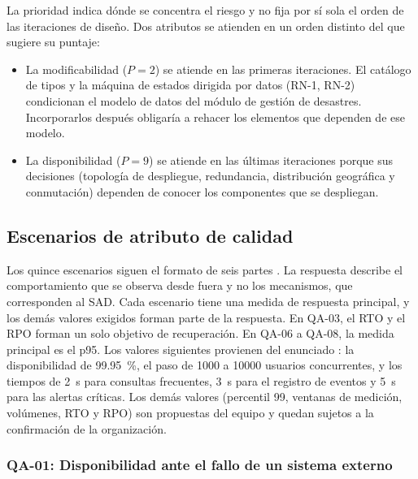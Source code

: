 \documentclass[11pt,letterpaper]{article}
\begin{document}
La prioridad indica dónde se concentra el riesgo y no fija por sí sola el orden de las iteraciones
de diseño. Dos atributos se atienden en un orden distinto del que sugiere su puntaje:

\begin{itemize}
  \item La modificabilidad ($P = 2$) se atiende en las primeras iteraciones. El catálogo de tipos y
        la máquina de estados dirigida por datos (RN-1, RN-2) condicionan el modelo de datos del
        módulo de gestión de desastres. Incorporarlos después obligaría a rehacer los elementos que
        dependen de ese modelo.
  \item La disponibilidad ($P = 9$) se atiende en las últimas iteraciones porque sus decisiones
        (topología de despliegue, redundancia, distribución geográfica y conmutación) dependen de
        conocer los componentes que se despliegan.
\end{itemize}

\subsection{Escenarios de atributo de calidad}
\label{sec:escenarios}

Los quince escenarios siguen el formato de seis partes \cite{bass}. La respuesta describe el
comportamiento que se observa desde fuera y no los mecanismos, que corresponden al SAD. Cada escenario
tiene una medida de respuesta principal, y los demás valores exigidos forman parte de la respuesta. En
QA-03, el RTO y el RPO forman un solo objetivo de recuperación. En QA-06 a QA-08, la medida principal
es el p95. Los valores siguientes provienen
del enunciado \cite{enunciado}: la disponibilidad de \qty{99.95}{\percent}, el paso de \num{1000} a
\num{10000} usuarios concurrentes, y los tiempos de \qty{2}{\second} para consultas frecuentes,
\qty{3}{\second} para el registro de eventos y \qty{5}{\second} para las alertas críticas. Los
demás valores (percentil 99, ventanas de medición, volúmenes, RTO y RPO) son propuestas del equipo
y quedan sujetos a la confirmación de la organización.

\subsubsection{QA-01: Disponibilidad ante el fallo de un sistema externo}
\label{sec:qa01}
\end{document}

